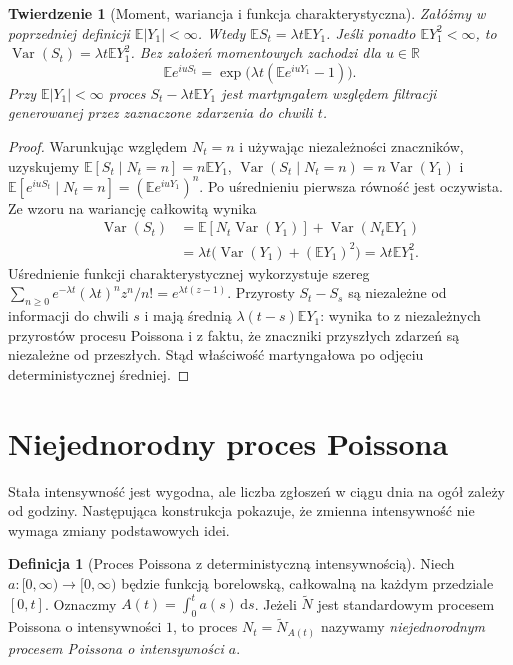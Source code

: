 \documentclass[11pt,a4paper,oneside]{report}
\numberwithin{equation}{chapter}
\theoremstyle{plain}
\newtheorem{twierdzenie}{Twierdzenie}[chapter]
\theoremstyle{definition}
\newtheorem{definicja}{Definicja}[chapter]
\theoremstyle{remark}
\newcommand{\R}{\mathbb{R}}
\newcommand{\E}{\mathbb{E}}
\newcommand{\Var}{\operatorname{Var}}
\newcommand{\dd}{\mathrm{d}}
\begin{document}
\begin{twierdzenie}[Moment, wariancja i funkcja charakterystyczna]
Załóżmy w poprzedniej definicji $\E|Y_1|<\infty$.
Wtedy $\E S_t=\lambda t\E Y_1$.
Jeśli ponadto $\E Y_1^2<\infty$, to
$\Var(S_t)=\lambda t\E Y_1^2$.
Bez założeń momentowych zachodzi dla $u\in\R$
\[
\E e^{iuS_t}=\exp\!\bigl(\lambda t(\E e^{iuY_1}-1)\bigr).
\]
Przy $\E|Y_1|<\infty$ proces
$S_t-\lambda t\E Y_1$ jest martyngałem względem
filtracji generowanej przez zaznaczone zdarzenia do chwili $t$.
\end{twierdzenie}
\begin{proof}
Warunkując względem $N_t=n$ i używając niezależności znaczników,
uzyskujemy $\E[S_t\mid N_t=n]=n\E Y_1$,
$\Var(S_t\mid N_t=n)=n\Var(Y_1)$ i
$\E[e^{iuS_t}\mid N_t=n]=(\E e^{iuY_1})^n$.
Po uśrednieniu pierwsza równość jest oczywista. Ze wzoru
na wariancję całkowitą wynika
\begin{align*}
\Var(S_t)&=\E[N_t\Var(Y_1)]
 +\Var(N_t\E Y_1)\\
&=\lambda t\bigl(\Var(Y_1)+(\E Y_1)^2\bigr)
=\lambda t\E Y_1^2.
\end{align*}
Uśrednienie funkcji charakterystycznej wykorzystuje szereg
$\sum_{n\ge0}e^{-\lambda t}(\lambda t)^n z^n/n!
=e^{\lambda t(z-1)}$.
Przyrosty $S_t-S_s$ są niezależne od informacji do chwili $s$
i mają średnią $\lambda(t-s)\E Y_1$:
wynika to z niezależnych przyrostów procesu Poissona i z faktu,
że znaczniki przyszłych zdarzeń są niezależne od przeszłych.
Stąd właściwość martyngałowa po odjęciu deterministycznej średniej.
\end{proof}

\section{Niejednorodny proces Poissona}
Stała intensywność jest wygodna, ale liczba zgłoszeń w ciągu
dnia na ogół zależy od godziny. Następująca konstrukcja pokazuje,
że zmienna intensywność nie wymaga zmiany podstawowych idei.

\begin{definicja}[Proces Poissona z deterministyczną intensywnością]
Niech $a:[0,\infty)\to[0,\infty)$ będzie funkcją borelowską,
całkowalną na każdym przedziale $[0,t]$. Oznaczmy
$A(t)=\int_0^t a(s)\,\dd s$.
Jeżeli $\widetilde N$ jest standardowym procesem Poissona
o intensywności $1$, to proces $N_t=\widetilde N_{A(t)}$
nazywamy \emph{niejednorodnym procesem Poissona o intensywności $a$}.
\end{definicja}
\end{document}
